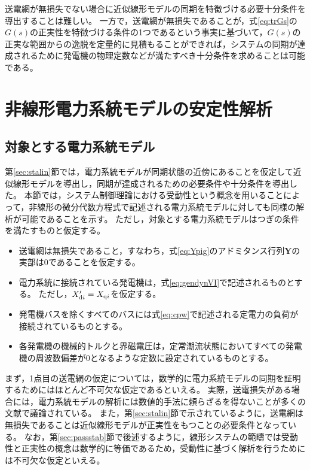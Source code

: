 \documentclass[tombow,dvipdfmx]{corona-a5}
\begin{document}
送電網が無損失でない場合に近似線形モデルの同期を特徴づける必要十分条件を導出することは難しい。
一方で，送電網が無損失であることが，式\ref{eq:trGs}の$G(s)$の正実性を特徴づける条件の1つであるという事実に基づいて，$G(s)$の正実な範囲からの逸脱を定量的に見積もることができれば，システムの同期が達成されるために発電機の物理定数などが満たすべき十分条件を求めることは可能である。


\section{非線形電力系統モデルの安定性解析\advanced}

\subsection{対象とする電力系統モデル}\label{sec:objmod}

第\ref{sec:stalin}節では，電力系統モデルが同期状態の近傍にあることを仮定して近似線形モデルを導出し，同期が達成されるための必要条件や十分条件を導出した。
本節では，システム制御理論における受動性という概念を用いることによって，非線形の微分代数方程式で記述される電力系統モデルに対しても同様の解析が可能であることを示す。
ただし，対象とする電力系統モデルはつぎの条件を満たすものと仮定する。

\begin{itemize}
\item 送電網は無損失であること，すなわち，式\ref{eq:Ypig}のアドミタンス行列$\bm{Y}$の実部は0であることを仮定する。
\item 電力系統に接続されている発電機は，式\ref{eq:gendynVI}で記述されるものとする。
ただし，$X_{{\rm d}i}'=X_{{\rm q}i}$を仮定する。
\item 発電機バスを除くすべてのバスには式\ref{eq:cpw}で記述される定電力の負荷が接続されているものとする。
\item 各発電機の機械的トルクと界磁電圧は，定常潮流状態においてすべての発電機の周波数偏差が0となるような定数に設定されているものとする。
\end{itemize}
まず，1点目の送電網の仮定については，数学的に電力系統モデルの同期を証明するためにはほとんど不可欠な仮定であるといえる。
実際，送電損失がある場合には，電力系統モデルの解析には数値的手法に頼らざるを得ないことが多くの文献で議論されている\cite{narasimhamurthi1984existence,yang2019distributed}。
また，第\ref{sec:stalin}節で示されているように，送電網は無損失であることは近似線形モデルが正実性をもつことの必要条件となっている。
なお，第\ref{sec:passstab}節で後述するように，線形システムの範疇では受動性と正実性の概念は数学的に等価であるため，受動性に基づく解析を行うためには不可欠な仮定といえる。
\end{document}
